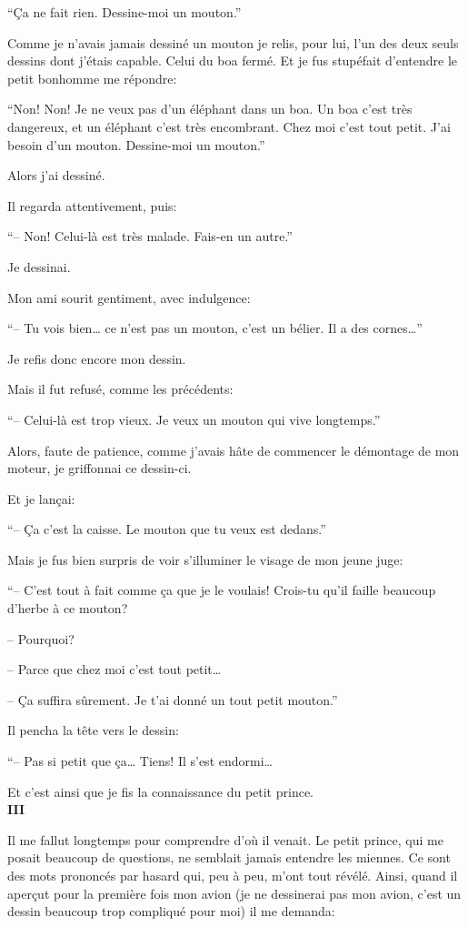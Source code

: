 \begin{Parallel}[p]{}{}
{``Ça ne fait rien. Dessine-moi un mouton.''

Comme je n'avais jamais dessiné un mouton je relis, pour lui, l'un des deux seuls dessins dont j'étais capable. Celui du boa fermé. Et je fus stupéfait d'entendre le
petit bonhomme me répondre:

``Non! Non! Je ne veux pas d'un
éléphant dans un boa. Un boa c'est
très dangereux, et un éléphant c'est très encombrant. Chez moi c'est tout petit. J'ai besoin d’un
mouton. Dessine-moi un mouton.''

Alors j'ai dessiné.

Il regarda attentivement, puis:

``-- Non! Celui-là est très
malade. Fais-en un autre.''

Je dessinai.

Mon ami sourit gentiment, avec
indulgence:

``-- Tu vois bien\ldots{} ce n'est pas un mouton, c'est un
bélier. Il a des cornes\ldots{}''

Je refis donc encore mon dessin.

Mais il fut refusé, comme les précédents:

``-- Celui-là est trop vieux. Je veux un
mouton qui vive longtemps.''

Alors, faute de patience, comme
j'avais hâte de commencer le démontage de mon moteur, je griffonnai ce
dessin-ci.

Et je lançai:

``-- Ça c'est la caisse. Le mouton que tu
veux est dedans.''

Mais je fus bien surpris de voir s'illuminer le
visage de mon jeune juge:

``-- C'est tout à fait comme ça que je le voulais!
Crois-tu qu'il faille beaucoup d'herbe à ce mouton?

-- Pourquoi?

-- Parce que chez moi c'est tout petit\ldots{}

-- Ça suffira sûrement. Je t'ai donné un tout
petit mouton.''

Il pencha la tête vers le dessin:

``-- Pas si petit que ça\ldots{} Tiens! Il s'est endormi\ldots{}

Et c'est ainsi que je fis la connaissance du petit
prince.\\

\textbf{III}

Il me fallut longtemps pour comprendre d'où il
venait. Le petit prince, qui me posait beaucoup de
questions, ne semblait jamais entendre les miennes.
Ce sont des mots prononcés par hasard qui, peu à
peu, m'ont tout révélé. Ainsi, quand il aperçut
pour la première fois mon avion (je ne dessinerai
pas mon avion, c'est un dessin beaucoup trop
compliqué pour moi) il me demanda:

}
\end{Parallel}
